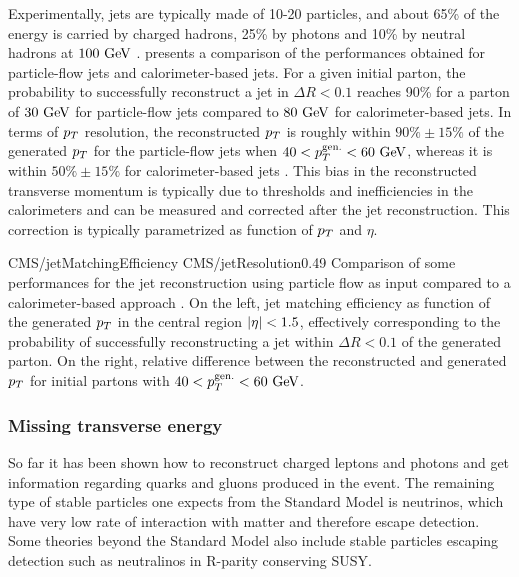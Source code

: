     Experimentally, jets are typically made of 10-20 particles, and about 65\%
    of the energy is carried by charged hadrons, 25\% by photons and 10\% by
    neutral hadrons at $100~\text{GeV}$ \cite{JetPerf}.  
    presents a comparison of the performances obtained for particle-flow jets
    and calorimeter-based jets. For a given initial parton, the probability to
    successfully reconstruct a jet in $\Delta R < 0.1$ reaches 90\% for a parton
    of $30~\text{GeV}$ for particle-flow jets compared to $80~\text{GeV}$ for
    calorimeter-based jets. In terms of $p_T$ resolution, the reconstructed
    $p_T$ is roughly within $90\% \pm 15\%$ of the generated $p_T$ for the
    particle-flow jets when $40 < p_T^\text{gen.} < 60~\text{GeV}$, whereas it is
    within $50\% \pm 15\%$ for calorimeter-based jets \cite{particleFlow}. This
    bias in the reconstructed transverse momentum is typically due to thresholds
    and inefficiencies in the calorimeters and can be measured and corrected
    after the jet reconstruction. This correction is typically parametrized as
    function of $p_T$ and $\eta$.

     {CMS/jetMatchingEfficiency}
    {CMS/jetResolution}{0.49} {Comparison of some performances for the jet
    reconstruction using particle flow as input compared to a calorimeter-based
    approach \cite{particleFlow}. On the left, jet matching efficiency as
    function of the generated $p_T$ in the central region $\left| \eta \right| < 1.5$,
    effectively corresponding to the probability of successfully reconstructing
    a jet within $\Delta R < 0.1$ of the generated parton. On the right,
    relative difference between the reconstructed and generated $p_T$ for
    initial partons with $40 < p_T^\text{gen.} < 60~\text{GeV}$.  }

        \subsubsection{Missing transverse energy}

    So far it has been shown how to reconstruct charged leptons and photons and
    get information regarding quarks and gluons produced in the event. The
    remaining type of stable particles one expects from the Standard Model is
    neutrinos, which have very low rate of interaction with matter and therefore
    escape detection. Some theories beyond the Standard Model also include
    stable particles escaping detection such as neutralinos in R-parity
    conserving SUSY.

